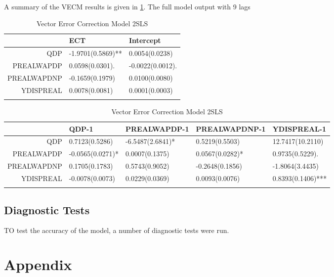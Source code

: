 \documentclass[11pt,preprint, authoryear]{elsarticle}
\numberwithin{equation}{section}
\numberwithin{figure}{section}
\numberwithin{table}{section}
\begin{document}
A summary of the VECM results is given in \ref{vecm1}. The full model
output with 9 lags

\begin{longtable}{rll}
  \hline
 & ECT & Intercept \\ 
  \hline
QDP & -1.9701(0.5869)**  & 0.0054(0.0238)     \\ 
  PREALWAPDP & 0.0598(0.0301).   & -0.0022(0.0012).   \\ 
  PREALWAPDNP & -0.1659(0.1979)     & 0.0100(0.0080)     \\ 
  YDISPREAL & 0.0078(0.0081)     & 0.0001(0.0003)     \\ 
   \hline
\hline
\caption{Vector Error Correction Model 2SLS\label{vecm1}} 
\end{longtable}
\begin{longtable}{rllll}
  \hline
 & QDP-1 & PREALWAPDP-1 & PREALWAPDNP-1 & YDISPREAL-1 \\ 
  \hline
QDP & 0.7123(0.5286)     & -6.5487(2.6841)*   & 0.5219(0.5503)     & 12.7417(10.2110)     \\ 
  PREALWAPDP & -0.0565(0.0271)*   & 0.0007(0.1375)     & 0.0567(0.0282)*   & 0.9735(0.5229).   \\ 
  PREALWAPDNP & 0.1705(0.1783)     & 0.5743(0.9052)     & -0.2648(0.1856)     & -1.8064(3.4435)     \\ 
  YDISPREAL & -0.0078(0.0073)     & 0.0229(0.0369)     & 0.0093(0.0076)     & 0.8393(0.1406)*** \\ 
   \hline
\hline
\caption{Vector Error Correction Model 2SLS\label{vecm11}} 
\end{longtable}

\hypertarget{diagnostic-tests}{%
\subsection{Diagnostic Tests}\label{diagnostic-tests}}

TO test the accuracy of the model, a number of diagnostic tests were
run. \newpage

\hypertarget{appendix}{%
\section{\texorpdfstring{Appendix
\label{app}}{Appendix }}\label{appendix}}


\end{document}

